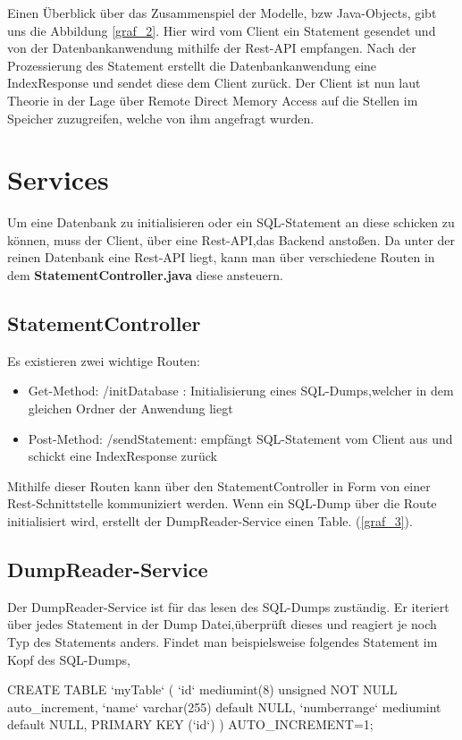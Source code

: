 Einen Überblick über das Zusammenspiel der Modelle, bzw Java-Objects, gibt uns die Abbildung \ref{graf_2}. 
Hier wird vom Client ein Statement gesendet und von der Datenbankanwendung mithilfe der Rest-API empfangen. Nach der Prozessierung des Statement erstellt die Datenbankanwendung eine IndexResponse und sendet diese dem Client zurück.
Der Client ist nun laut Theorie in der Lage über Remote Direct Memory Access auf die Stellen im Speicher zuzugreifen, welche von ihm angefragt wurden.


\section{Services}
Um eine Datenbank zu initialisieren oder ein SQL-Statement an diese schicken zu können, muss der Client, über eine Rest-API,das Backend anstoßen.
Da unter der reinen Datenbank eine Rest-API liegt, kann man über verschiedene Routen in dem \textbf{StatementController.java} diese ansteuern.


\subsection{StatementController}
Es existieren zwei wichtige Routen:

\begin{itemize}
 \item Get-Method: /initDatabase : Initialisierung eines SQL-Dumps,welcher in dem gleichen Ordner der Anwendung liegt
 \item Post-Method: /sendStatement: empfängt SQL-Statement vom Client aus und schickt eine IndexResponse zurück
\end{itemize}

Mithilfe dieser Routen kann über den StatementController in Form von einer Rest-Schnittstelle kommuniziert werden.
Wenn ein SQL-Dump über die Route initialisiert wird, erstellt der DumpReader-Service einen Table. (\ref{graf_3}). 


\subsection{DumpReader-Service}
\label{DumpReader}
Der DumpReader-Service ist für das lesen des SQL-Dumps zuständig. Er iteriert über jedes Statement in der Dump Datei,überprüft dieses und reagiert je noch Typ des Statements anders.
Findet man beispielsweise folgendes Statement im Kopf des SQL-Dumps,
\\

\begin{terminalblock}
  \begin{textcode}
CREATE TABLE `myTable` (
  `id` mediumint(8) unsigned NOT NULL auto_increment,
  `name` varchar(255) default NULL,
  `numberrange` mediumint default NULL,
  PRIMARY KEY (`id`)
) AUTO_INCREMENT=1;
  \end{textcode}
\end{terminalblock}

